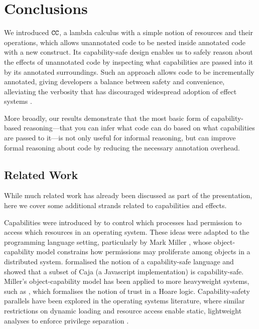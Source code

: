 \section{Conclusions}

We introduced $\mathtt{CC}$, a lambda calculus with a simple notion of resources and
their operations, which allows unannotated code to be nested inside annotated code
with a new  construct. Its capability-safe design enables us to safely
reason about the effects of unannotated code by inspecting what capabilities are
passed into it by its annotated surroundings. Such an approach allows code to be
incrementally annotated, giving developers a balance between safety and convenience,
alleviating the verbosity that has discouraged widespread adoption of effect systems
\cite{rytz12}.

More broadly, our results demonstrate that the most basic form of capability-based reasoning---that you can infer what code can do based on what capabilities are passed to it---is not only useful for informal reasoning, but can improve formal reasoning about code by reducing the necessary annotation overhead.

\subsection{Related Work}

While much related work has already been discussed as part of the presentation, here we cover some additional strands related to capabilities and effects.

Capabilities were introduced by \cite{dennis66} to control which processes had
permission to access which resources in an operating system.
These ideas were adapted to the programming language setting, particularly by
Mark Miller \cite{miller06}, whose object-capability model constrains how permissions
may proliferate among objects in a distributed system. \cite{maffeis10} formalised
the notion of a capability-safe language and showed that a subset of Caja (a
Javascript implementation) is capability-safe. Miller's object-capability model has been
applied to more heavyweight systems, such as \cite{drossopoulou07}, which
formalises the notion of trust in a Hoare logic. Capability-safety parallels have been
explored in the operating systems literature, where similar restrictions on dynamic
 loading and resource access \cite{hunt07} enable static, lightweight analyses to
  enforce privilege separation \cite{madhavapeddy13}.

